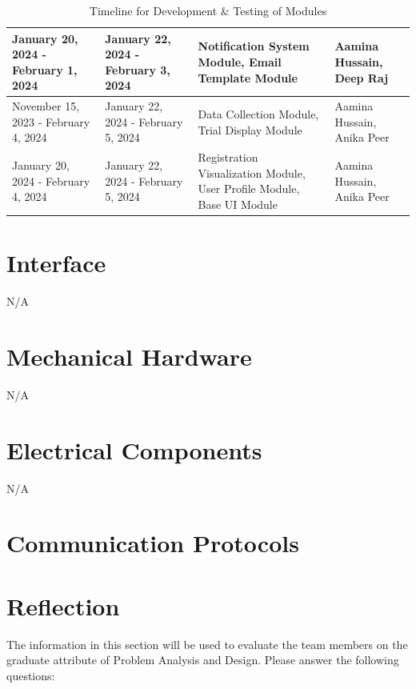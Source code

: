 \documentclass[12pt, titlepage]{article}
\begin{document}
\begin{table}[H]
\begin{tabular}{|p{}|p{}|p{}|p{}|}
  January 20, 2024 - February 1, 2024                     & January 22, 2024 - February 3, 2024                & Notification System Module, Email Template Module                      & Aamina Hussain, Deep Raj                   \\ \hline
  November 15, 2023 - February 4, 2024                    & January 22, 2024 - February 5, 2024                & Data Collection Module, Trial Display Module                           & Aamina Hussain, Anika Peer                 \\ \hline
  January 20, 2024 - February 4, 2024                     & January 22, 2024 - February 5, 2024                & Registration Visualization Module, User Profile Module, Base UI Module & Aamina Hussain, Anika Peer                 \\ \hline
  \end{tabular}
  \caption{\label{TimelineTable}Timeline for Development \& Testing of Modules}
  \end{table}

% 

\newpage{}

\appendix

\section{Interface} 

N/A 

\section{Mechanical Hardware}

N/A

\section{Electrical Components}

N/A

\section{Communication Protocols}

\section{Reflection}

The information in this section will be used to evaluate the team members on the
graduate attribute of Problem Analysis and Design.  Please answer the following questions:
\end{document}
